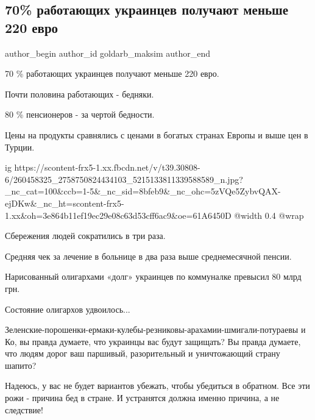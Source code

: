  
 
 
 
 
 
\subsection{70\% работающих украинцев получают меньше 220 евро}
\label{sec:23_11_2021.fb.goldarb_maksim.1.menjshe_220_evro}
 
\ifcmt
 author_begin
   author_id goldarb_maksim
 author_end
\fi

70 \% работающих украинцев получают меньше 220 евро. 

Почти половина работающих - бедняки. 

80 \% пенсионеров - за чертой бедности. 

Цены на продукты сравнялись с ценами в богатых странах Европы и выше цен в
Турции. 

\ifcmt
  ig https://scontent-frx5-1.xx.fbcdn.net/v/t39.30808-6/260458325_2758750824434103_5215133811339588589_n.jpg?_nc_cat=100&ccb=1-5&_nc_sid=8bfeb9&_nc_ohc=5zVQe5ZybvQAX-ejDKw&_nc_ht=scontent-frx5-1.xx&oh=3e864b11ef19ec29e08c63d53cff6ac9&oe=61A6450D
  @width 0.4
  @wrap 
\fi

Сбережения людей сократились в три раза. 

Средняя чек за лечение в больнице в два раза выше среднемесячной пенсии. 

Нарисованный олигархами «долг» украинцев по коммуналке превысил 80 млрд грн. 

Состояние олигархов удвоилось...

Зеленские-порошенки-ермаки-кулебы-резниковы-арахамии-шмигали-потураевы и Ко, вы
правда думаете, что украинцы вас будут защищать? Вы правда думаете, что людям
дорог ваш паршивый, разорительный и уничтожающий страну шапито? 

Надеюсь, у вас не будет вариантов убежать, чтобы убедиться в обратном. Все эти
рожи - причина бед в стране. И устранятся должна именно причина, а не
следствие!

